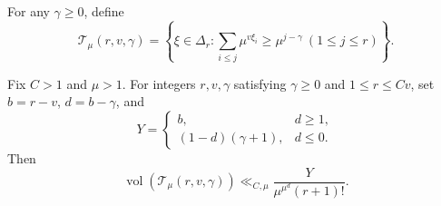 For any $\gamma\geq0$, define
\[
 \mathcal T_\mu(r,v,\gamma)=
 \left\{\xi\in\Delta_r:
    \sum_{i\leq j}\mu^{v\xi_i}\geq\mu^{j-\gamma}
                           \ (1\leq j\leq r)\right\}.
\]

\begin{lemma}
\label{ordsumrepair:integer-bound}
Fix $C>1$ and $\mu>1$. For integers $r,v,\gamma$ satisfying
$\gamma\geq0$ and $1\leq r\leq Cv$, set $b=r-v$, $d=b-\gamma$, and
\[
 Y=\begin{cases}b,&d\geq1,\\
                 (1-d)(\gamma+1),&d\leq0.
   \end{cases}
\]
Then
\begin{equation}
 \operatorname{vol}(\mathcal T_\mu(r,v,\gamma))
 \ll_{C,\mu}\frac{Y}{\mu^{\mu^d}(r+1)!}.
 \label{ordsumrepair:integer-estimate}
\end{equation}
\end{lemma}

